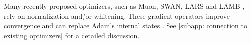 Many recently proposed optimizers, such as Muon, SWAN, LARS and LAMB \citep{jordan2024muon, ma2024swan, you2017lars, you2019lamb}, rely on normalization and/or whitening. These gradient operators improve convergence \citep{you2017lars, jordan2024muon} and can replace Adam’s internal states \citep{ma2024swan}. See \cref{subapp: connection to existing optimizers} for a detailed discussion.
